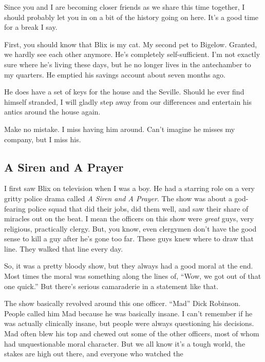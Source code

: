\documentclass[12pt,twoside]{report}
\begin{document}
Since you and I are becoming closer friends as we share this time
together, I should probably let you in on a bit of the history going
on here.  It's a good time for a break I say.

First, you should know that Blix is my cat.  My second pet to
Bigelow. Granted, we hardly see each other anymore.  He's completely
self-sufficient. I'm not exactly sure where he's living these days,
but he no longer lives in the antechamber to my quarters.  He emptied
his savings account about seven months ago.

He does have a set of keys for the house and the Seville.  Should he
ever find himself stranded, I will gladly step away from our
differences and entertain his antics around the house again.

Make no mistake.  I miss having him around.  Can't imagine he misses
my company, but I miss his.



\subsection{A Siren and A Prayer}



I first saw Blix on television when I was a boy.  He had a starring
role on a very gritty police drama called {\em A Siren and A Prayer}.
The show was about a god-fearing police squad that did their jobs, did
them well, and saw their share of miracles out on the beat.  I mean
the officers on this show were {\em great} guys, very religious,
practically clergy.  But, you know, even clergymen don't have the good
sense to kill a guy after he's gone too far. These guys knew where to
draw that line.  They walked that line every day.
	
So, it was a pretty bloody show, but they always had a good moral at
the end.  Most times the moral was something along the lines of,
``Wow, we got out of that one quick.''  But there's serious
camaraderie in a statement like that.

The show basically revolved around this one officer.  ``Mad'' Dick
Robinson.  People called him Mad because he was basically insane.  I
can't remember if he was actually clinically insane, but people were
always questioning his decisions.  Mad often blew his top and chewed
out some of the other officers, most of whom had unquestionable moral
character.  But we all know it's a tough world, the stakes are high
out there, and everyone who watched the 
\end{document}
